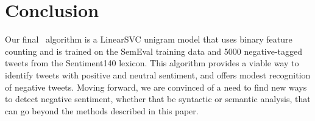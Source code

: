 \section{Conclusion}
Our final \AlgName\ algorithm is a LinearSVC unigram model that uses binary feature counting and is trained on the SemEval training data and 5000 negative-tagged tweets from the Sentiment140 lexicon. This algorithm provides a viable way to identify tweets with positive and neutral sentiment, and offers modest recognition of negative tweets. Moving forward, we are convinced of a need to find new ways to detect negative sentiment, whether that be syntactic or semantic analysis, that can go beyond the methods described in this paper. 